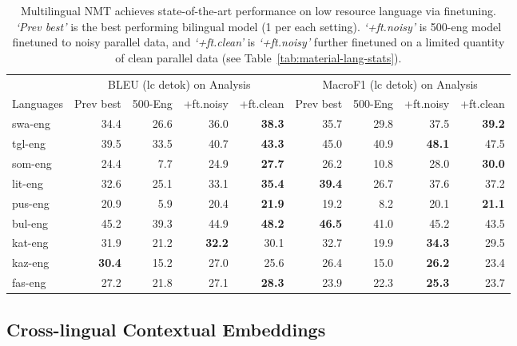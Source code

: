 \begin{table}
\small 
\centering
    \begin{tabular}{l | rrrr | rrrr}
    \hline
& \multicolumn{4}{c|}{BLEU (lc detok) on Analysis} & \multicolumn{4}{c}{MacroF1 (lc detok) on Analysis} \\
Languages & Prev best & 500-Eng & +ft.noisy & +ft.clean & Prev best & 500-Eng & +ft.noisy & +ft.clean \\ \hline \hline
swa-eng & 34.4 & 26.6 & 36.0 & \textbf{38.3} & 35.7 & 29.8 & 37.5 & \textbf{39.2} \\
tgl-eng & 39.5 & 33.5 & 40.7 & \textbf{43.3} & 45.0 & 40.9 & \textbf{48.1} & 47.5 \\
som-eng & 24.4 & 7.7 & 24.9 & \textbf{27.7} & 26.2 & 10.8 & 28.0 & \textbf{30.0} \\
lit-eng & 32.6 & 25.1 & 33.1 & \textbf{35.4} & \textbf{39.4} & 26.7 & 37.6 & 37.2 \\
pus-eng & 20.9 & 5.9 & 20.4 & \textbf{21.9} & 19.2 & 8.2 & 20.1 & \textbf{21.1} \\
bul-eng & 45.2 & 39.3 & 44.9 & \textbf{48.2} & \textbf{46.5} & 41.0 & 45.2 & 43.5 \\
kat-eng & 31.9 & 21.2 & \textbf{32.2} & 30.1 & 32.7 & 19.9 & \textbf{34.3} & 29.5 \\
kaz-eng & \textbf{30.4} & 15.2 & 27.0 & 25.6 & 26.4 & 15.0 & \textbf{26.2} & 23.4 \\
fas-eng & 27.2 & 21.8 & 27.1 & \textbf{28.3} & 23.9 & 22.3 & \textbf{25.3} & 23.7 \\ \hline
\end{tabular} 
    \caption[Multilingual NMT achieves state-of-the-art performance on low resource language via finetuning]{Multilingual NMT achieves state-of-the-art performance on low resource language via finetuning. \textit{`Prev best'} is the best performing bilingual model (1 per each setting). \textit{`+ft.noisy'} is 500-eng model finetuned to noisy parallel data, and \textit{`+ft.clean'} is \textit{`+ft.noisy'} further finetuned on a limited quantity of clean parallel data (see Table~\ref{tab:material-lang-stats}). }
    \label{tab:material-scores}
\end{table}


\subsection{Cross-lingual Contextual Embeddings}

